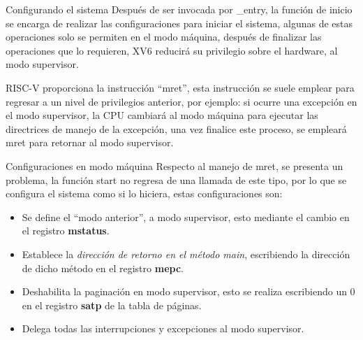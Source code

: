 \documentclass{libs/ufc_format}
\begin{document}
\begin{frame}{Configurando el sistema}
  Después de ser invocada por \_entry, la función de inicio se encarga de realizar las configuraciones para iniciar el sistema, algunas de estas operaciones solo se permiten en el modo máquina, después de finalizar las operaciones que lo requieren, XV6 reducirá su privilegio sobre el hardware, al modo supervisor.

  \vspace{0.4cm}

  RISC-V proporciona la instrucción “mret”, esta instrucción se suele emplear para regresar a un nivel de privilegios anterior, por ejemplo: si ocurre una excepción en el modo supervisor, la CPU cambiará al modo máquina para ejecutar las directrices de manejo de la excepción, una vez finalice este proceso, se empleará mret para retornar al modo supervisor.
\end{frame}
\begin{frame}{Configuraciones en modo máquina}
  Respecto al manejo de mret, se presenta un problema, la función start no regresa de una llamada de este tipo, por lo que se configura el sistema como si lo hiciera, estas configuraciones son:

  \vspace{0.3cm}

  \begin{itemize}
    \item Se define el “modo anterior”, a modo supervisor, esto mediante el cambio en el registro \textbf{mstatus}.
    \item Establece la \emph{dirección de retorno en el método main}, escribiendo la dirección de dicho método en el registro \textbf{mepc}.
    \item  Deshabilita la paginación en modo supervisor, esto se realiza escribiendo un 0 en el registro \textbf{satp} de la tabla de páginas.
    \item Delega todas las interrupciones y excepciones al modo supervisor.
  \end{itemize}
\end{frame}
\end{document}
